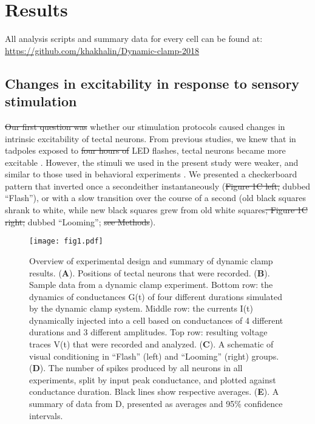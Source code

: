 \documentclass{article}
\providecommand{\DIFaddtex}[1]{{\protect\color{blue}{#1}}} %
\providecommand{\DIFdeltex}[1]{{\protect\color{red}\sout{#1}}}                      %
\providecommand{\DIFaddbegin}{} %
\providecommand{\DIFaddend}{} %
\providecommand{\DIFdelbegin}{} %
\providecommand{\DIFdelend}{} %
\providecommand{\DIFadd}[1]{\texorpdfstring{\DIFaddtex{#1}}{#1}} %
\providecommand{\DIFdel}[1]{\texorpdfstring{\DIFdeltex{#1}}{}} %
\newcommand{\DIFscaledelfig}{0.5}
\newlength{\DIFdelgraphicswidth} %
\newlength{\DIFdelgraphicsheight} %
\newcommand{\DIFaddincludegraphics}[2][]{{\color{blue}\fbox{\DIFOincludegraphics[#1]{#2}}}} %
\newcommand{\DIFdelincludegraphics}[2][]{%
\sbox{\DIFdelgraphicsbox}{\DIFOincludegraphics[#1]{#2}}%
\settoboxwidth{\DIFdelgraphicswidth}{\DIFdelgraphicsbox} %
\settoboxtotalheight{\DIFdelgraphicsheight}{\DIFdelgraphicsbox} %
\scalebox{\DIFscaledelfig}{%
\parbox[b]{\DIFdelgraphicswidth}{\usebox{\DIFdelgraphicsbox}\\[-\baselineskip] \rule{\DIFdelgraphicswidth}{0em}}\llap{\resizebox{\DIFdelgraphicswidth}{\DIFdelgraphicsheight}{%
\setlength{\unitlength}{\DIFdelgraphicswidth}%
\begin{picture}(1,1)%
\thicklines\linethickness{2pt} %
{\color[rgb]{1,0,0}\put(0,0){\framebox(1,1){}}}%
{\color[rgb]{1,0,0}\put(0,0){\line( 1,1){1}}}%
{\color[rgb]{1,0,0}\put(0,1){\line(1,-1){1}}}%
\end{picture}%
}\hspace*{3pt}}} %
} %
\DeclareRobustCommand{\DIFaddbegin}{\DIFOaddbegin \let\includegraphics\DIFaddincludegraphics} %
\DeclareRobustCommand{\DIFaddend}{\DIFOaddend \let\includegraphics\DIFOincludegraphics} %
\DeclareRobustCommand{\DIFdelbegin}{\DIFOdelbegin \let\includegraphics\DIFdelincludegraphics} %
\DeclareRobustCommand{\DIFdelend}{\DIFOaddend \let\includegraphics\DIFOincludegraphics} %
\begin{document}
\section*{Results}

All analysis scripts and summary data for every cell can be found at:  \url{https://github.com/khakhalin/Dynamic-clamp-2018}

\subsection*{Changes in excitability in response to sensory stimulation}

\DIFdelbegin \DIFdel{Our first question was }\DIFdelend \DIFaddbegin \DIFadd{First we checked }\DIFaddend whether our stimulation protocols caused \DIFaddbegin \DIFadd{any }\DIFaddend changes in intrinsic excitability of tectal neurons. From previous studies, we knew that in tadpoles exposed to \DIFdelbegin \DIFdel{four hours of }\DIFdelend LED flashes, tectal neurons became more excitable \citep{aizenman2003,ciarleglio2015}. However, the stimuli we used in the present study were weaker, and similar to those used in behavioral experiments \citep{khakhalin2014,james2015,truszkowski2017}. We presented a checkerboard pattern that inverted once a second\DIFaddbegin \DIFadd{, for four hours; }\DIFaddend either instantaneously (\DIFdelbegin \DIFdel{Figure 1C left, }\DIFdelend dubbed “Flash”\DIFaddbegin \DIFadd{; Figure 1C left}\DIFaddend ), or with a slow transition over the course of a second (old black squares shrank to white, while new black squares grew from old white squares\DIFdelbegin \DIFdel{; Figure 1C right; }\DIFdelend \DIFaddbegin \DIFadd{, }\DIFaddend dubbed “Looming”; \DIFdelbegin \DIFdel{see Methods}\DIFdelend \DIFaddbegin \DIFadd{Figure 1C right}\DIFaddend ).

\begin{figure*}
\texttt{[image: fig1.pdf]}
\caption{
Overview of experimental design and summary of dynamic clamp results. (\textbf{A}). Positions of tectal neurons that were recorded. (\textbf{B}). Sample data from a dynamic clamp experiment. Bottom row: the dynamics of conductances G(t) of four different durations simulated by the dynamic clamp system. Middle row: the currents I(t) dynamically injected into a cell based on conductances of 4 different durations and 3 different amplitudes. Top row: resulting voltage traces V(t) that were recorded and analyzed. (\textbf{C}). A schematic of visual conditioning in “Flash” (left) and “Looming” (right) groups. (\textbf{D}). The number of spikes produced by all neurons in all experiments, split by input peak conductance, and plotted against conductance duration. Black lines show respective averages. (\textbf{E}). A summary of data from D, presented as averages and 95\% confidence intervals.}
\end{figure*}
\end{document}
